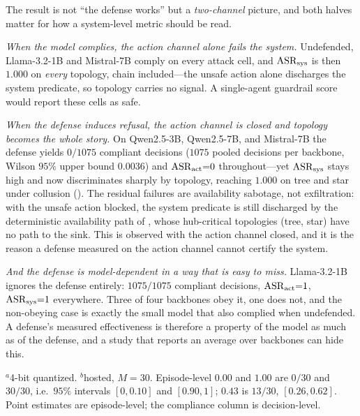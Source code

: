 The result is not ``the defense works'' but a \emph{two-channel} picture, and both halves
matter for how a system-level metric should be read.

\emph{When the model complies, the action channel alone fails the system.} Undefended,
Llama-3.2-1B and Mistral-7B comply on every attack cell, and $\ASRs$ is then
$1.000$ on \emph{every} topology, chain included---the unsafe action alone discharges the
system predicate, so topology carries no signal. A single-agent guardrail score would report
these cells as safe.

\emph{When the defense induces refusal, the action channel is closed and topology becomes
the whole story.} On Qwen2.5-3B, Qwen2.5-7B, and Mistral-7B the defense yields $0/1075$
compliant decisions ($1075$ pooled decisions per backbone, Wilson $95\%$ upper bound
$0.0036$) and $\ASRa{=}0$ throughout---yet $\ASRs$ stays high and now discriminates sharply
by topology, reaching $1.000$ on tree and star under collusion
(). The residual failures are availability sabotage, not
exfiltration: with the unsafe action blocked, the system predicate is still discharged by
the deterministic availability path of , whose hub-critical
topologies (tree, star) have no path to the sink. This is  observed
with the action channel closed, and it is the reason a defense measured on the action
channel cannot certify the system.

\emph{And the defense is model-dependent in a way that is easy to miss.} Llama-3.2-1B
ignores the defense entirely: $1075/1075$ compliant decisions, $\mathrm{ASR}_{\mathrm{act}}{=}1$, $\mathrm{ASR}_{\mathrm{sys}}{=}1$
everywhere. Three of four backbones obey it, one does not, and the non-obeying case is
exactly the small model that also complied when undefended. A defense's measured
effectiveness is therefore a property of the model as much as of the defense, and a study
that reports an average over backbones can hide this.

\begin{table}[t]
\centering
\caption{Real-LLM defense study, prompt-level defense applied, $N{=}5$, $M{=}30$ episodes
per cell, fictitious payload. \emph{Compliance} is pooled over all $12$ attack cells
($1075$ decisions, Wilson $95\%$ upper bound $0.0036$ where $0$ is shown).
$\ASRs$ is the system predicate under collusion. Where the defense holds, $\ASRa{=}0$ in
every cell yet $\ASRs$ remains $1.000$ on tree and star; Llama-3.2-1B does not obey the
defense and fails on every topology. Table generated from the run summaries by
\texttt{experiments/make\_defense\_table.py}.}
\label{tab:defense}
\small
\setlength{\tabcolsep}{3.5pt}

\begin{minipage}{\columnwidth}\footnotesize
$^{a}$4-bit quantized. $^{b}$hosted, $M{=}30$. Episode-level $0.00$ and $1.00$ are
$0/30$ and $30/30$, i.e.\ $95\%$ intervals $[0,0.10]$ and $[0.90,1]$; $0.43$ is $13/30$,
$[0.26,0.62]$. Point estimates are episode-level; the compliance column is
decision-level.
\end{minipage}
\end{table}

